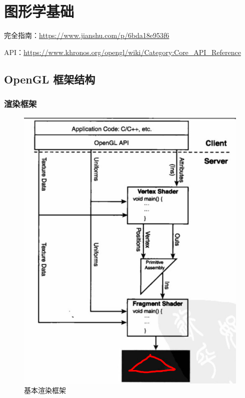 \documentclass[UTF8,a4paper,12pt]{ctexbook}
\begin{document}
\newpage
\chapter{图形学基础}
	完全指南：\url{https://www.jianshu.com/p/6bda18e953f6}
	
	API：\url{https://www.khronos.org/opengl/wiki/Category:Core_API_Reference}
	
	\section{OpenGL 框架结构}
	
		\subsection{渲染框架}
			\begin{figure}[H]
				\centering
				\includegraphics[width=.91\linewidth]{openGlArch}
				\caption{基本渲染框架}
			\end{figure}
			
\end{document}
